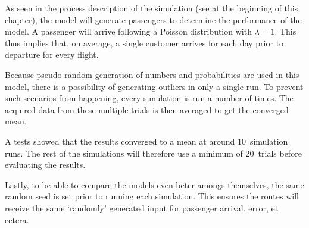 As seen in the process description of the simulation (see at the beginning of this chapter), the model will generate passengers to determine the performance of the model. A passenger will arrive following a Poisson distribution with $\lambda = 1$. This thus implies that, on average, a single customer arrives for each day prior to departure for every flight.

Because pseudo random generation of numbers and probabilities are used in this model, there is a possibility of generating outliers in only a single run. To prevent such scenarios from happening, every simulation is run a number of times. The acquired data from these multiple trials is then averaged to get the converged mean.

A tests showed that the results converged to a mean at around 10~simulation runs. The rest of the simulations will therefore use a minimum of 20~trials before evaluating the results.

Lastly, to be able to compare the models even beter amongs themselves, the same random seed is set prior to running each simulation. This ensures the routes will receive the same `randomly' generated input for passenger arrival, error, et cetera.